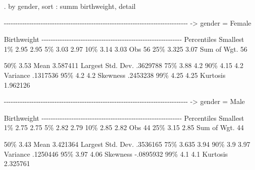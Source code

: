 \documentclass[
]{memoir}
\newenvironment{Shaded}{\begin{snugshade}}{\end{snugshade}}
\newcommand{\NormalTok}[1]{#1}
\begin{document}
\begin{Shaded}
\begin{Highlighting}[]
\NormalTok{. by gender, sort : summ birthweight, detail}

\NormalTok{{-}{-}{-}{-}{-}{-}{-}{-}{-}{-}{-}{-}{-}{-}{-}{-}{-}{-}{-}{-}{-}{-}{-}{-}{-}{-}{-}{-}{-}{-}{-}{-}{-}{-}{-}{-}{-}{-}{-}{-}{-}{-}{-}{-}{-}{-}{-}{-}{-}{-}{-}{-}{-}{-}{-}{-}{-}{-}{-}{-}{-}{-}{-}{-}{-}{-}{-}{-}{-}{-}{-}{-}{-}{-}{-}{-}{-}{-}{-}{-}}
\NormalTok{{-}\textgreater{} gender = Female}

\NormalTok{                         Birthweight}
\NormalTok{{-}{-}{-}{-}{-}{-}{-}{-}{-}{-}{-}{-}{-}{-}{-}{-}{-}{-}{-}{-}{-}{-}{-}{-}{-}{-}{-}{-}{-}{-}{-}{-}{-}{-}{-}{-}{-}{-}{-}{-}{-}{-}{-}{-}{-}{-}{-}{-}{-}{-}{-}{-}{-}{-}{-}{-}{-}{-}{-}{-}{-}}
\NormalTok{      Percentiles      Smallest}
\NormalTok{ 1\%         2.95           2.95}
\NormalTok{ 5\%         3.03           2.97}
\NormalTok{10\%         3.14           3.03       Obs                  56}
\NormalTok{25\%        3.325           3.07       Sum of Wgt.          56}

\NormalTok{50\%         3.53                      Mean           3.587411}
\NormalTok{                        Largest       Std. Dev.      .3629788}
\NormalTok{75\%         3.88            4.2}
\NormalTok{90\%         4.15            4.2       Variance       .1317536}
\NormalTok{95\%          4.2            4.2       Skewness       .2453238}
\NormalTok{99\%         4.25           4.25       Kurtosis       1.962126}

\NormalTok{{-}{-}{-}{-}{-}{-}{-}{-}{-}{-}{-}{-}{-}{-}{-}{-}{-}{-}{-}{-}{-}{-}{-}{-}{-}{-}{-}{-}{-}{-}{-}{-}{-}{-}{-}{-}{-}{-}{-}{-}{-}{-}{-}{-}{-}{-}{-}{-}{-}{-}{-}{-}{-}{-}{-}{-}{-}{-}{-}{-}{-}{-}{-}{-}{-}{-}{-}{-}{-}{-}{-}{-}{-}{-}{-}{-}{-}{-}{-}{-}}
\NormalTok{{-}\textgreater{} gender = Male}

\NormalTok{                         Birthweight}
\NormalTok{{-}{-}{-}{-}{-}{-}{-}{-}{-}{-}{-}{-}{-}{-}{-}{-}{-}{-}{-}{-}{-}{-}{-}{-}{-}{-}{-}{-}{-}{-}{-}{-}{-}{-}{-}{-}{-}{-}{-}{-}{-}{-}{-}{-}{-}{-}{-}{-}{-}{-}{-}{-}{-}{-}{-}{-}{-}{-}{-}{-}{-}}
\NormalTok{      Percentiles      Smallest}
\NormalTok{ 1\%         2.75           2.75}
\NormalTok{ 5\%         2.82           2.79}
\NormalTok{10\%         2.85           2.82       Obs                  44}
\NormalTok{25\%         3.15           2.85       Sum of Wgt.          44}

\NormalTok{50\%         3.43                      Mean           3.421364}
\NormalTok{                        Largest       Std. Dev.      .3536165}
\NormalTok{75\%        3.635           3.94}
\NormalTok{90\%          3.9           3.97       Variance       .1250446}
\NormalTok{95\%         3.97           4.06       Skewness      {-}.0895932}
\NormalTok{99\%          4.1            4.1       Kurtosis       2.325761}
\end{Highlighting}
\end{Shaded}
\end{document}
